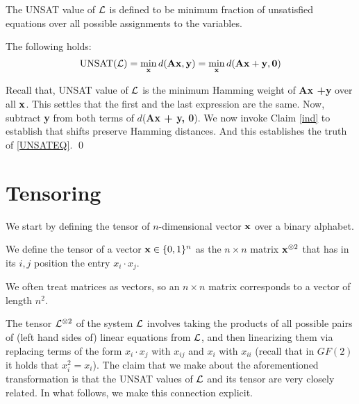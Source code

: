 \begin{definition}[UNSAT($\eL$)] The UNSAT value of $\eL$ is defined
  to be minimum fraction of unsatisfied equations over all possible
  assignments to the variables.
\end{definition}


\begin{proposition} \label{unsat}
The following holds:
\begin{equation}
                \mbox{UNSAT(}{\cal L}\mbox{)} = \min_{{\bf x}} d({\bf Ax, y}) = \min_{{\bf x}} d({\bf Ax + y, 0}) \label{UNSATEQ}
\end{equation}
\end{proposition}
 Recall that, UNSAT value of $\eL$ is the
minimum Hamming weight of {\bf Ax +y} over all ${\bf x}$. This settles
that the first and the last expression are the same. Now, subtract
{\bf y} from both terms of $d$({\bf Ax + y, 0}). We now invoke Claim
\ref{ind} to establish that shifts preserve Hamming distances.
And this establishes the truth of \eqref{UNSATEQ}. \qed \\


\section{Tensoring} \label{section:Tensoring}

We start by defining the tensor of $n$-dimensional vector
${\bf x}$ over a binary alphabet.

\begin{definition}[Tensor]\label{Tensoring}
  We define the tensor of a vector ${\bf x} \in \{0,1\}^n$ as the $n\times n$ matrix ${\bf
    x}^{\otimes 2}$ that has in its $i,j$ position the entry $x_i\cdot x_j$.
\end{definition}
We often treat matrices as vectors, so an $n\times n$ matrix corresponds to a vector of length $n^2$.

The tensor ${\cal L}^{\otimes 2}$ of the system $\eL$ involves
taking the products of all possible pairs of (left hand sides of) linear equations from $\eL$,
and then linearizing them via replacing terms of the form $x_i \cdot
x_j$ with $x_{ij}$ and $x_i$ with $x_{ii}$ (recall that in $GF(2)$ it holds that $x_i^2 = x_i$). The claim that we make about the aforementioned
transformation is that the UNSAT values of $\eL$ and its tensor are
very closely related. In what follows, we make this connection
explicit. 

